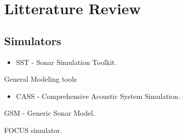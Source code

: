 \ifMonolithic\else\fi

\chapter{Litterature Review}


\section{Simulators}



\begin{itemize}
\item SST - Sonar Simulation Toolkit. \cite{Goddard}
\end{itemize}

General Modeling tools
\begin{itemize}
\item CASS - Comprehensive Acoustic System Simulation. \cite{Goddard}
\end{itemize}


GSM - Generic Sonar Model. 


FOCUS simulator. 



\ifMonolithic\else\fi